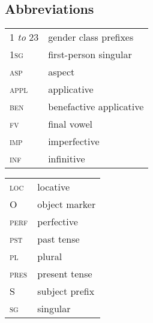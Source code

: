 \documentclass[output=paper]{langsci/langscibook}
\begin{document}
\subsection*{Abbreviations} 

\begin{tabularx}{.45\textwidth}{lX}
 1 \emph{to} 23 &  gender class prefixes\\
 1{\scshape sg} &  first-person singular\\
 {\scshape asp} & aspect\\
 {\scshape appl} & applicative\\
 {\scshape ben}  & benefactive applicative\\
 {\scshape fv} & final vowel\\
 {\scshape imp} &  imperfective\\
 {\scshape inf} &  infinitive\\
\end{tabularx}
\begin{tabularx}{.45\textwidth}{lX}
 {\scshape loc} &  locative\\
  {\scshape O} &  object marker\\
  {\scshape perf} &  perfective\\
  {\scshape pst} &  past tense\\
  {\scshape pl} & plural\\
  {\scshape pres} & present tense\\
  S  & subject prefix\\
  {\scshape sg} & singular\\
\end{tabularx}
% 


\printbibliography[heading=subbibliography,notkeyword=this]
\end{document}
